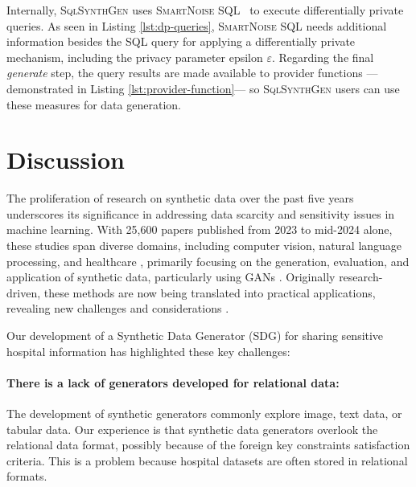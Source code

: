 \documentclass[11pt]{article}
\begin{document}
Internally, \textsc{SqlSynthGen} uses \textsc{SmartNoise SQL}~\cite{allen2020opendp} to execute differentially private queries.
As seen in Listing \ref{lst:dp-queries}, \textsc{SmartNoise SQL} needs additional information besides the SQL query for applying a differentially private mechanism, including the privacy parameter epsilon $\varepsilon$.
Regarding the final \emph{generate} step, the query results are made available to provider functions ---demonstrated in Listing \ref{lst:provider-function}--- so \textsc{SqlSynthGen} users can use these measures for data generation. 


\section{Discussion}

The proliferation of research on synthetic data over the past five years underscores its significance in addressing data scarcity and sensitivity issues in machine learning. With 25,600 papers published from 2023 to mid-2024 alone, these studies span diverse domains, including computer vision, natural language processing, and healthcare \cite{Fonseca23}, primarily focusing on the generation, evaluation, and application of synthetic data, particularly using GANs \cite{10.3390/math10152733}. Originally research-driven, these methods are now being translated into practical applications, revealing new challenges and considerations \cite{jordon2022synthetic}.

\vspace{1em}

Our development of a Synthetic Data Generator (SDG) for sharing sensitive hospital information has highlighted these key challenges:

\paragraph{There is a lack of generators developed for relational data:}
The development of synthetic generators commonly explore image, text data, or tabular data. Our experience is that synthetic data generators overlook the relational data format, possibly because of the foreign key constraints satisfaction criteria. This is a problem because hospital datasets are often stored in relational formats. 
\end{document}

